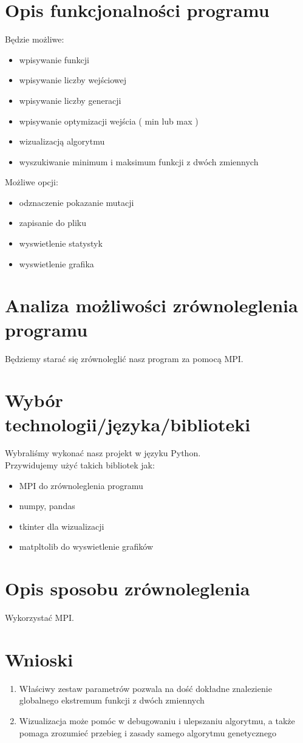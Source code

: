 \documentclass[a4paper, 12pt]{article}
\begin{document}
\section{Opis funkcjonalności programu}
Będzie możliwe:
\begin{itemize}
    \item wpisywanie funkcji
    \item wpisywanie liczby wejściowej 
    \item wpisywanie liczby generacji
    \item wpisywanie optymizacji wejścia ( min lub max )
    \item wizualizacją algorytmu
    \item wyszukiwanie minimum i maksimum funkcji z dwóch zmiennych
\end{itemize}
Możliwe opcji:
\begin{itemize}
    \item odznaczenie pokazanie mutacji
    \item zapisanie do pliku
    \item wyswietlenie statystyk
    \item wyswietlenie grafika
\end{itemize}
\section{Analiza możliwości zrównoleglenia programu}
\hspace*{1cm} Będziemy starać się zrównoleglić nasz program za pomocą MPI.
\section{Wybór technologii/języka/biblioteki}
\hspace*{1cm} Wybraliśmy wykonać nasz projekt w języku Python.\\ 
Przywidujemy użyć takich bibliotek jak:
\begin{itemize}
    \item MPI do zrównoleglenia programu
    \item numpy, pandas
    \item tkinter dla wizualizacji
    \item matpltolib do wyswietlenie grafików
\end{itemize}
\section{Opis sposobu zrównoleglenia}
Wykorzystać MPI.
\section{Wnioski} 
\begin{enumerate}
    \item Właściwy zestaw parametrów pozwala na dość dokładne znalezienie globalnego ekstremum funkcji z dwóch zmiennych
    \item Wizualizacja może pomóc w debugowaniu i ulepszaniu algorytmu, a także pomaga zrozumieć przebieg i zasady samego algorytmu genetycznego
\end{enumerate}

\label{LastPage}~
\label{LastPageOfBackMatter}~		
\end{document}
